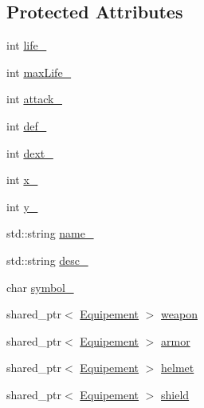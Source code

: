 \subsection*{Protected Attributes}
\begin{DoxyCompactItemize}
\item 
int \hyperlink{classCharacter_a7676503674823a7233994c5c6504d3b4}{life\-\_\-}
\item 
int \hyperlink{classCharacter_ae9c9e6575e6bca213c523f5dbadc59d8}{max\-Life\-\_\-}
\item 
int \hyperlink{classCharacter_af7c66c07511bfb6a844510c09262f9f7}{attack\-\_\-}
\item 
int \hyperlink{classCharacter_af5403de4a39c8859b69335e60ea3d6ca}{def\-\_\-}
\item 
int \hyperlink{classCharacter_a3cc8f2752c0199a62e8fef854bfca6d5}{dext\-\_\-}
\item 
int \hyperlink{classCharacter_af0ed42181b8730437905b21485879471}{x\-\_\-}
\item 
int \hyperlink{classCharacter_aeda4757626cbc50f408dc93eb541a831}{y\-\_\-}
\item 
std\-::string \hyperlink{classCharacter_aca012a249f706cd301674fff9497b5de}{name\-\_\-}
\item 
std\-::string \hyperlink{classCharacter_af3efafb3ef9078df69d9cefb701b9b25}{desc\-\_\-}
\item 
char \hyperlink{classCharacter_af3b304ea19adc493b2daa9bd1e80229d}{symbol\-\_\-}
\item 
shared\-\_\-ptr$<$ \hyperlink{classEquipement}{Equipement} $>$ \hyperlink{classCharacter_af779f72e2ccbc275350ab80b99136c7c}{weapon}
\item 
shared\-\_\-ptr$<$ \hyperlink{classEquipement}{Equipement} $>$ \hyperlink{classCharacter_a3077b0ff06c2f9f96eeb2b79593d667c}{armor}
\item 
shared\-\_\-ptr$<$ \hyperlink{classEquipement}{Equipement} $>$ \hyperlink{classCharacter_a0b86c1922a49c65ed6abc04f52b633fb}{helmet}
\item 
shared\-\_\-ptr$<$ \hyperlink{classEquipement}{Equipement} $>$ \hyperlink{classCharacter_ac74a5ebc37ffa8dcc078c2530c0c947a}{shield}
\end{DoxyCompactItemize}


